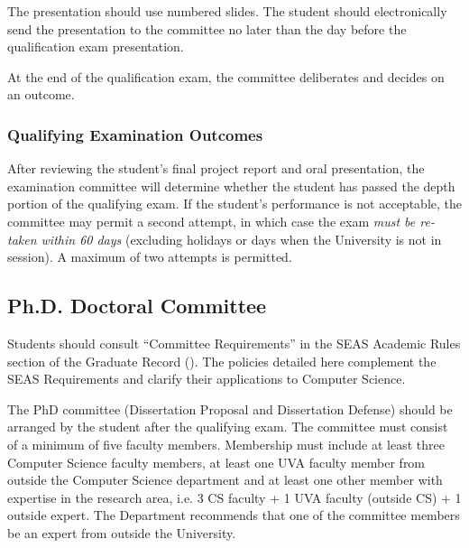The presentation should use numbered slides. The student should electronically
send the presentation to the committee no later than the day before the
qualification exam presentation.

At the end of the qualification exam, the committee deliberates and decides on an outcome.

\hypertarget{qualifying-examination-outcomes}{
\subsubsection{Qualifying Examination Outcomes}
\label{qualifying-examination-depth-outcomes}
}

After reviewing the student’s final project report and oral presentation, the
examination committee will determine whether the student has passed the depth
portion of the qualifying exam. If the student's performance is not acceptable,
the committee may permit a second attempt, in which case the exam
\emph{must be re-taken within 60 days} (excluding holidays or days when
the University is not in session). A maximum of two attempts is permitted.

\hypertarget{phd-doctoral-committee}{
\subsection{Ph.D. Doctoral Committee}
\label{phd-committee}
}



Students should consult ``Committee Requirements'' in the SEAS Academic Rules
section of the Graduate Record (). The policies
detailed here complement the SEAS Requirements and clarify their applications
to Computer Science.

The PhD committee (Dissertation Proposal and Dissertation Defense) should be
arranged by the student after the qualifying exam. The committee must consist
of a minimum of five faculty members. Membership must include at least three
Computer Science faculty members, at least one UVA faculty member from outside
the Computer Science department and at least one other member with expertise in
the research area, i.e. 3 CS faculty + 1 UVA faculty (outside CS) + 1 outside
expert. The Department recommends that one of the committee members be an
expert from outside the University.

